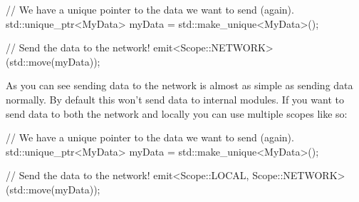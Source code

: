 \documentclass[english,12pt]{scrartcl}
\begin{document}
				\begin{cppcode}
					// We have a unique pointer to the data we want to send (again).
					std::unique_ptr<MyData> myData = std::make_unique<MyData>();
					
					// Send the data to the network!
					emit<Scope::NETWORK>(std::move(myData));
				\end{cppcode}
				
				As you can see sending data to the network is almost as simple as sending data normally.
				By default this won't send data to internal modules. 
				If you want to send data to both the network and locally you can use multiple scopes like so:
				
				\begin{cppcode}
					// We have a unique pointer to the data we want to send (again).
					std::unique_ptr<MyData> myData = std::make_unique<MyData>();
					
					// Send the data to the network!
					emit<Scope::LOCAL, Scope::NETWORK>(std::move(myData));
				\end{cppcode}
				
\end{document}
